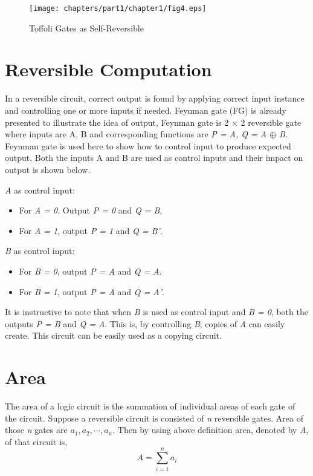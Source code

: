 \begin{figure}[h]
\centering
\texttt{[image: chapters/part1/chapter1/fig4.eps]}
\caption{Toffoli Gates as Self-Reversible}
\label{fig:p1_c1_fig4}
\end{figure}

\section{Reversible Computation}
In a reversible circuit, correct output is found by applying correct input instance and controlling one or more inputs if needed. Feynman gate (FG) is already presented to illustrate the idea of  output, Feynman gate is 2 $\times$ 2 reversible gate where inputs are A, B and corresponding functions are \textit{P = A, Q = A $\oplus$ B}. Feynman gate is used here to show how to control input to produce expected output. Both the inputs A and B are used as control inputs and their impact on output is shown below.

\textit{A} as control input:
\begin{itemize}
\item { } For \textit{A = 0}. Output \textit{P = 0 }and \textit{Q = B},
\item { } For \textit{A = 1}, output \textit{P = 1} and \textit{Q = B'}.

\end{itemize}

\textit{B} as control input:
\begin{itemize}
\item For \textit{B = 0}, output \textit{P = A} and \textit{Q = A}.
\item For \textit{B = 1}, output \textit{P = A} and\textit{ Q = A'}.

\end{itemize}

It is instructive to note that when \textit{B} is used as control input and \textit{B = 0}, both the outputs \textit{P = B} and \textit{Q = A}. This is, by controlling \textit{B}; copies of \textit{A} can easily create. This circuit can be easily used as a copying circuit.

\section{Area}
The area of a logic circuit is the summation of individual areas of each gate of the circuit. Suppose a reversible circuit is consisted of \textit{n} reversible gates. Area of those \textit{n} gates are $a_1, a_2,\cdots, a_n$. Then by using above definition area, denoted by \textit{A}, of that circuit is,
\begin{equation*}
A=\sum_{i=1}^{n}a_i
\end{equation*}

